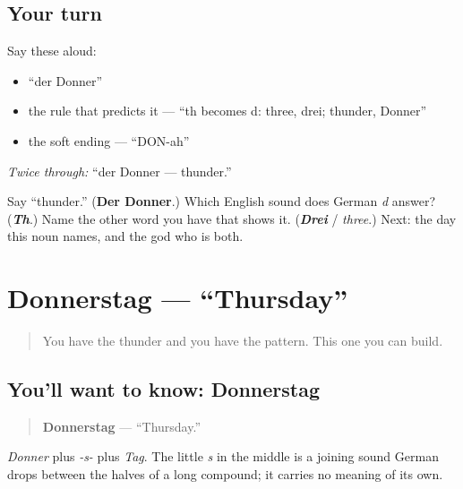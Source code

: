 \subsection*{Your turn}
Say these aloud:

\begin{itemize}
\raggedright
  \item \textquotedblleft{}der Donner\textquotedblright{}
  \item the rule that predicts it — \textquotedblleft{}th becomes d: three, drei; thunder, Donner\textquotedblright{}
  \item the soft ending — \textquotedblleft{}DON-ah\textquotedblright{}
\end{itemize}

\emph{Twice through:} \textquotedblleft{}der Donner — thunder.\textquotedblright{}

\begin{tcolorbox}[breakable,colback=teal!4,colframe=teal!35!black,title={Before you move on}]
Say \textquotedblleft{}thunder.\textquotedblright{} (\textbf{Der Donner}.) Which English sound does German \emph{d} answer? (\emph{\textbf{Th}}.) Name the other word you have that shows it. (\emph{\textbf{Drei}} / \emph{three}.) Next: the day this noun names, and the god who is both.
\end{tcolorbox}
\section[Donnerstag]{Donnerstag — \textquotedblleft{}Thursday\textquotedblright{}}

\label{lesson:GE-C07-donnerstag}



\begin{quote}
You have the thunder and you have the pattern. This one you can build.
\end{quote}

\subsection*{You'll want to know: Donnerstag}
\begin{quote}
\textbf{Donnerstag} — \textquotedblleft{}Thursday.\textquotedblright{}
\end{quote}

\emph{Donner} plus \emph{-s-} plus \emph{Tag}. The little \emph{s} in the middle is a joining sound German drops between the halves of a long compound; it carries no meaning of its own.

